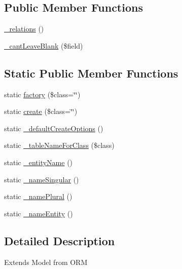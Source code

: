 \subsection*{Public Member Functions}
\begin{DoxyCompactItemize}
\item 
\hyperlink{classapp_1_1models_1_1core_1_1_base_model_a55ae23613f7ee044582497c5d099dac6}{\-\_\-relations} ()
\item 
\hyperlink{classapp_1_1models_1_1core_1_1_base_model_a4f489106bd6c5140a51817fe14e28db3}{\-\_\-cant\-Leave\-Blank} (\$field)
\end{DoxyCompactItemize}
\subsection*{Static Public Member Functions}
\begin{DoxyCompactItemize}
\item 
static \hyperlink{classapp_1_1models_1_1core_1_1_base_model_a23d019365c40167af9d7bff43adaddfa}{factory} (\$class=\char`\"{}\char`\"{})
\item 
static \hyperlink{classapp_1_1models_1_1core_1_1_base_model_a2669a792d3d91d6a5e3e6fd8d8e75471}{create} (\$class=\char`\"{}\char`\"{})
\item 
static \hyperlink{classapp_1_1models_1_1core_1_1_base_model_adc7aafe368abef4801d85742f3b6a2d4}{\-\_\-default\-Create\-Options} ()
\item 
static \hyperlink{classapp_1_1models_1_1core_1_1_base_model_ac4e4c8235609c45c16b29dd95f88dc17}{\-\_\-table\-Name\-For\-Class} (\$class)
\item 
static \hyperlink{classapp_1_1models_1_1core_1_1_base_model_aad238b583605dc1eff7d0f73e642ca50}{\-\_\-entity\-Name} ()
\item 
static \hyperlink{classapp_1_1models_1_1core_1_1_base_model_a7216a25f596c6d039b6ad01cbfb8ccd6}{\-\_\-name\-Singular} ()
\item 
static \hyperlink{classapp_1_1models_1_1core_1_1_base_model_a43367662fc9b1f15c5bdb1409bba4597}{\-\_\-name\-Plural} ()
\item 
static \hyperlink{classapp_1_1models_1_1core_1_1_base_model_a7da33fb6848ab590373b028760b964ec}{\-\_\-name\-Entity} ()
\end{DoxyCompactItemize}


\subsection{Detailed Description}
Extends Model from O\-R\-M

